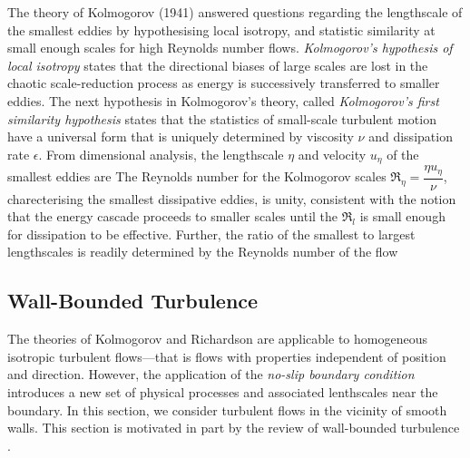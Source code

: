 The theory of Kolmogorov (1941) answered questions regarding the lengthscale of the smallest eddies by hypothesising local isotropy, and statistic similarity at small enough scales for high Reynolds number flows. \textit{Kolmogorov's hypothesis of local isotropy} states that the directional biases of large scales are lost in the chaotic scale-reduction process as energy is successively transferred to smaller eddies.
The next hypothesis in Kolmogorov's theory, called \textit{Kolmogorov's first similarity hypothesis} states that the statistics of small-scale turbulent motion have a universal form that is uniquely determined by viscosity $\nu$ and dissipation rate $\epsilon$. From dimensional analysis, the lengthscale $\eta$ and velocity $u_\eta$ of the smallest eddies are
The Reynolds number for the Kolmogorov scales $\Re_\eta=\dfrac{\eta u_\eta}{\nu}$, charecterising the smallest dissipative eddies, is unity, consistent with the notion that the energy cascade proceeds to smaller scales until the $\Re_l$ is small enough for dissipation to be effective. Further, the ratio of the smallest to largest lengthscales is readily determined by the Reynolds number of the flow

\subsection{Wall-Bounded Turbulence}
\label{sec:wall-bndd-turb}
The theories of Kolmogorov and Richardson are applicable to homogeneous isotropic turbulent flows---that is flows with properties independent of position and direction. However, the application of the \textit{no-slip boundary condition} introduces a new set of physical processes and associated lenthscales near the boundary. In this section, we consider turbulent flows in the vicinity of smooth walls. This section is motivated in part by the review of wall-bounded turbulence \cite{wall-bounded-turb}.

